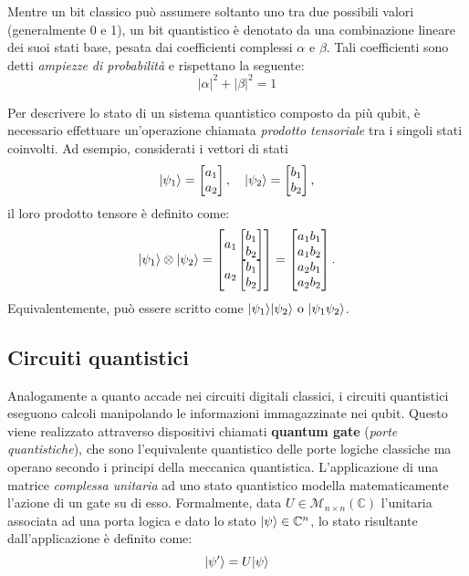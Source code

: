 Mentre un bit classico può assumere soltanto uno tra due possibili valori
(generalmente 0 e 1), un bit quantistico è denotato da una combinazione lineare
dei suoi stati base, pesata dai coefficienti complessi $\alpha$ e $\beta$. Tali
coefficienti sono detti \emph{ampiezze di probabilità} e rispettano la seguente:
\begin{equation}
	|\alpha|^2 + |\beta|^2 = 1
	\label{eq:qubit-prob}
\end{equation}

Per descrivere lo stato di un sistema quantistico composto da più qubit, è
necessario effettuare un'operazione chiamata \emph{prodotto tensoriale} tra i
singoli stati coinvolti. Ad esempio, considerati i vettori di stati
\[
\lvert\psi_1\rangle = \begin{bmatrix} a_1 \\ a_2 \end{bmatrix}, \quad \lvert\psi_2\rangle = \begin{bmatrix} b_1 \\ b_2 \end{bmatrix},
\]
il loro prodotto tensore è definito come:
\begin{equation}
\lvert\psi_1\rangle \otimes \lvert\psi_2\rangle
= \begin{bmatrix}
a_1 \begin{bmatrix} b_1 \\ b_2 \end{bmatrix} \\
a_2 \begin{bmatrix} b_1 \\ b_2 \end{bmatrix}
\end{bmatrix} =
\begin{bmatrix}
a_1 b_1 \\ a_1 b_2 \\ a_2 b_1 \\ a_2 b_2
\end{bmatrix}.
\label{eq:tensor-prod}
\end{equation}
Equivalentemente, può essere scritto come $\lvert\psi_1\rangle\lvert\psi_2\rangle \text{ o } \lvert\psi_1
\psi_2\rangle$.

\subsection{Circuiti quantistici}

Analogamente a quanto accade nei circuiti digitali classici, i circuiti
quantistici eseguono calcoli manipolando le informazioni immagazzinate nei
qubit. Questo viene realizzato attraverso dispositivi chiamati \textbf{quantum
gate} (\emph{porte quantistiche}), che sono l'equivalente quantistico delle porte logiche classiche
ma operano secondo i principi della meccanica quantistica. L'applicazione di una
matrice \emph{complessa unitaria} ad uno stato quantistico modella matematicamente l'azione di un
gate su di esso. Formalmente, data $U \in \mathcal{M}_{n \times n}(\mathbb{C})$
l'unitaria associata ad una porta logica e dato lo stato $\lvert\psi\rangle \in
\mathbb{C}^n$, lo stato risultante dall'applicazione è definito come:
\begin{equation}
	\lvert\psi'\rangle = U\lvert\psi\rangle
	\label{eq:gate-res-state}
\end{equation}

